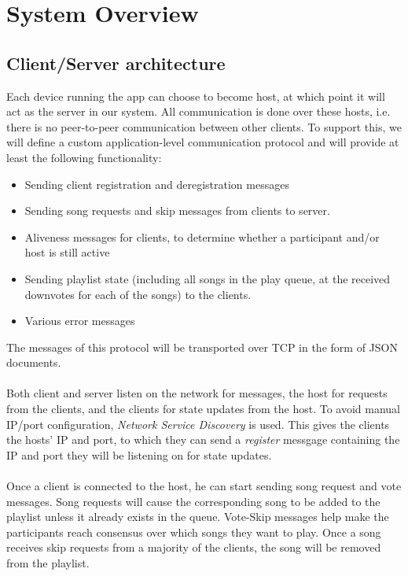 \documentclass{report}
\begin{document}
\section{System Overview}
\subsection{Client/Server architecture}

Each device running the app can choose to become host, at which point it will
act as the server in our system. All communication is done over these hosts, 
i.e. there is no peer-to-peer communication between other clients.
To support this, we will define a custom application-level communication protocol 
and will provide at least the following functionality:
\begin{itemize}
\item Sending client registration and deregistration messages
\item Sending song requests and skip messages from clients to server.
\item Aliveness messages for clients, to determine whether a participant and/or host is still active
\item Sending playlist state (including all songs in the play queue, at the received downvotes for each of the songs) to the clients.
\item Various error messages
\end{itemize}
%
The messages of this protocol will be transported over TCP in the form of JSON documents.\\\\
%
Both client and server listen on the network for messages,
the host for requests from the clients, and the clients for state updates
from the host. To avoid manual IP/port configuration, \emph{Network Service Discovery}
\cite{nsd} is used. This gives the clients the hosts' IP and port,
to which they can send a \emph{register} messgage containing the IP and port they
will be listening on for state updates. \\\\
%
Once a client is connected to the host, he can start sending song request and vote messages.
Song requests will cause the corresponding song to be added to the playlist unless
it already exists in the queue. Vote-Skip messages help make the participants reach
consensus over which songs they want to play. Once a song receives skip requests
from a majority of the clients, the song will be removed from the playlist.\\\\ 
\end{document}
